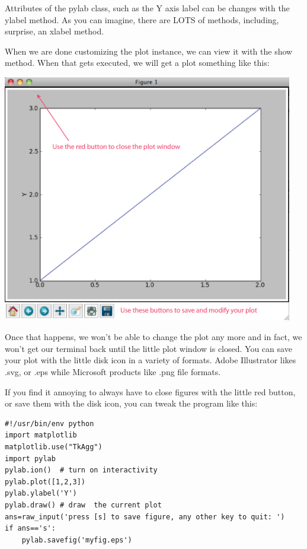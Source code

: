 \documentclass[11pt]{book}
\begin{document}
{Attributes of the {\color{blue}pylab} class, such as the Y axis label can be changes with the {\color{blue}ylabel} method.  As you can imagine, there are LOTS of methods, including, surprise, an {\color{blue}xlabel} method.  

When we are done customizing the plot instance, we can view it with the {\color{blue}show} method.  When that gets executed, we will get a plot something like this:

   \includegraphics[width=5in]{EPSfiles/matplotlib1.eps} 
   
   \noindent Once that happens, we won't be able to change the plot any more and in fact, we won't get our terminal back until the little plot window is closed.   You can save your plot with the little disk icon in a variety of formats.  Adobe Illustrator likes .svg, or .eps while Microsoft products like .png file formats.  

If you find it annoying to always have to close figures with the little red button, or save them with the disk icon, you can tweak the program like this:

{ \color{blue}\begin{verbatim}
#!/usr/bin/env python
import matplotlib
matplotlib.use("TkAgg") 
import pylab 
pylab.ion()  # turn on interactivity
pylab.plot([1,2,3]) 
pylab.ylabel('Y') 
pylab.draw() # draw  the current plot
ans=raw_input('press [s] to save figure, any other key to quit: ')
if ans=='s':
    pylab.savefig('myfig.eps')
\end{verbatim}}

}
\end{document}
